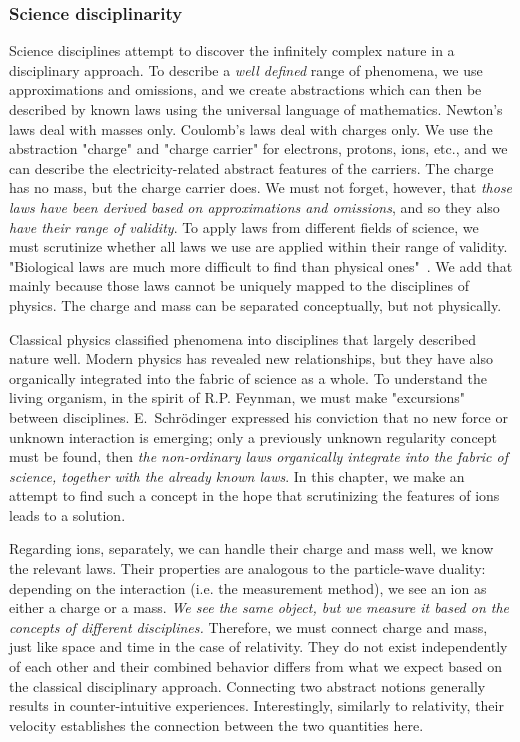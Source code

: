 \subsubsection[Disciplinarity]{Science disciplinarity\label{sec:Physics-ScienceDisciplinarity}}

Science disciplines attempt to discover the infinitely complex nature  
in a \hypertarget{disciplinarity}{disciplinary approach}.
To describe a \textit{well defined} range of phenomena, we use approximations and omissions,
and we create \hypertarget{Abstractions}{abstractions} which can then be described by known laws using
the universal language of mathematics.
Newton's laws deal with masses only. Coulomb's laws deal with charges only.
We use the abstraction "charge"
and "charge carrier" for electrons, protons, ions, etc., and we can describe the
electricity-related abstract features of the carriers.
The charge has no mass, but the charge carrier does.
We must not forget, however, that \textit{those laws have been
derived based on approximations and omissions}, and so they also \textit{have
their range of validity}. To apply laws from different fields of science,
we must scrutinize whether all laws we use are applied within their range of validity. 
 "Biological laws are much more difficult to find than physical ones"~\cite{VollmerLimitsOfBiology:1995}.
We add that mainly because those laws cannot be uniquely mapped
to the disciplines of physics. The charge and mass can be separated conceptually, but not physically.


Classical physics classified phenomena into disciplines that largely described nature well.
Modern physics has revealed new relationships, but they have also organically integrated into the fabric of science as a whole.
To understand the living organism, in the spirit of R.P. Feynman, we must make "excursions" between disciplines. 
E.~Schrödinger expressed his conviction that no new force or unknown interaction is emerging;
only a previously unknown regularity concept must be found,
then \textit{the non-ordinary laws organically integrate into the fabric of science, together with the already known laws}.
In this chapter, we make an attempt to find such a concept in the hope that scrutinizing
the features of ions leads to a solution.
 

Regarding ions,  separately, we can handle their charge and mass well, we know the relevant laws.
Their properties are analogous to the particle-wave duality: depending on the interaction (i.e. the measurement method), we see an ion as either a charge or a mass.
\textit{We see the same object, but we measure it based on the concepts of different disciplines.}
Therefore, we must connect charge and mass, just like space and time in the case of relativity.
They do not exist independently of each other and their combined behavior differs from what we expect based on the classical disciplinary approach.
Connecting two abstract notions generally results in counter-intuitive experiences.
Interestingly, similarly to relativity, their velocity establishes the connection between the two quantities here.

